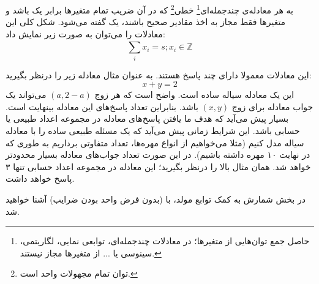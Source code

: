 


\begin{DEFINITION}
    \p
    به هر معادله‌ی چندجمله‌ای\footnote{حاصل جمع توان‌هایی از متغیر‌ها؛ در معادلات چندجمله‌ای،
    توابعی نمایی، لگاریتمی، سینوسی یا ... از متغیر‌ها مجاز نیستند.}
    خطی\footnote{توان تمام مجهولات واحد است.}
    که در آن ضریب تمام متغیر‌ها برابر یک باشد
    و متغیر‌ها فقط مجاز به اخذ مقادیر صحیح باشند،
    یک
    گفته می‌شود.
    شکل کلی این معادلات را می‌توان به صورت زیر نمایش داد:
    $$\sum\limits_{i}^{} {x_i} = s ; x_i \in \mathbb{Z}$$
\end{DEFINITION}

\p
این معادلات معمولا دارای چند پاسخ هستند.
به عنوان مثال معادله زیر را درنظر بگیرید:
$$x + y = 2$$
این یک معادله سیاله ساده است.
واضح است که هر زوج
$(a, 2-a)$
می‌تواند یک جواب معادله برای زوج
$(x,y)$
باشد. بنابراین تعداد پاسخ‌های این معادله بینهایت است.
بسیار پیش می‌آید که هدف ما یافتن پاسخ‌های معادله در مجموعه اعداد طبیعی یا حسابی باشد.
این شرایط زمانی پیش می‌آید که یک مسئله طبیعی ساده را با معادله سیاله مدل کنیم
(مثلا می‌خواهیم از انواع مهره‌ها، تعداد متفاوتی برداریم به طوری که در نهایت ۱۰ مهره داشته باشیم).
در این صورت تعداد جواب‌های معادله بسیار محدود‌تر خواهد شد.
همان مثال بالا را درنظر بگیرید؛ این معادله در مجموعه اعداد حسابی تنها ۳ پاسخ خواهد داشت.






\p
در بخش شمارش به کمک توابع مولد، با
(بدون فرض واحد بودن ضرایب)
آشنا خواهید شد.